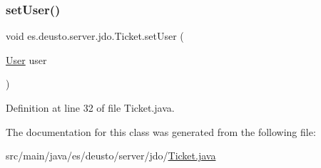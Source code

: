 \subsubsection{\texorpdfstring{setUser()}{setUser()}}
{\footnotesize\ttfamily void es.\+deusto.\+server.\+jdo.\+Ticket.\+set\+User (\begin{DoxyParamCaption}\item[{\mbox{\hyperlink{classes_1_1deusto_1_1server_1_1jdo_1_1_user}{User}}}]{user }\end{DoxyParamCaption})}



Definition at line 32 of file Ticket.\+java.



The documentation for this class was generated from the following file\+:\begin{DoxyCompactItemize}
\item 
src/main/java/es/deusto/server/jdo/\mbox{\hyperlink{_ticket_8java}{Ticket.\+java}}\end{DoxyCompactItemize}
